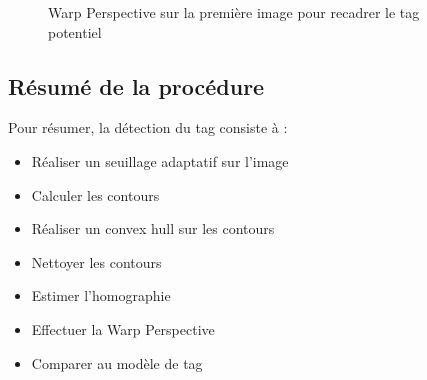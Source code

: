         \begin{figure}[h]
            \centering
            \hspace{.02\textwidth}
            \caption{Warp Perspective sur la première image pour recadrer le tag potentiel}
        \end{figure}
            
        \subsection{Résumé de la procédure}

        Pour résumer, la détection du tag consiste à :

        \begin{itemize}
            \item Réaliser un seuillage adaptatif sur l'image
            \item Calculer les contours
            \item Réaliser un convex hull sur les contours
            \item Nettoyer les contours
            \item Estimer l'homographie
            \item Effectuer la Warp Perspective
            \item Comparer au modèle de tag
        \end{itemize}

